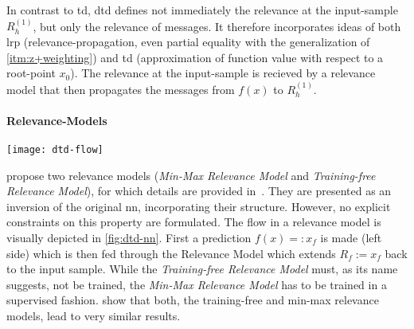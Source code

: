 \par
In contrast to \gls{td}, \gls{dtd} defines not immediately the relevance at the input-sample \(R_{h}^{(1)}\), but only the relevance of \glspl{message}. It therefore incorporates ideas of both \gls{lrp} (relevance-propagation, even partial equality with the generalization of \ref{itm:z+weighting}) and \gls{td} (approximation of function value with respect to a root-point \(x_0\)). The relevance at the input-sample is recieved by a relevance model that then propagates the \glspl{message} from \(f(x)\) to \(R_{h}^{(1)}\).
\paragraph{Relevance-Models}
\begin{figure*}[h]
    \center
    \texttt{[image: dtd-flow]}
    \caption[Deeper Neural Network; prediction and propagation via \gls{dtd}]{\textbf{Left:} A neural network at prediction time. \textbf{Right:} exemplary \gls{dtd} Relevance Model, adopted from \protect\cite{Montavon.2017}. Note, that in this work, usually \(R_h\) is used instead of \(R_p\).}\label{fig:dtd-nn}
\end{figure*}
 propose two relevance models (\textit{Min-Max Relevance Model} and \textit{Training-free Relevance Model}), for which details are provided in~\cite{Montavon.2017}. They are presented as an inversion of the original \gls{nn}, incorporating their structure. However, no explicit constraints on this property are formulated. The flow in a relevance model is visually depicted in \cref{fig:dtd-nn}. First a prediction \(f(x)=:x_f\) is made (left side) which is then fed through the Relevance Model which extends \(R_f:=x_f\) back to the input sample. While the \textit{Training-free Relevance Model} must, as its name suggests, not be trained, the \textit{Min-Max Relevance Model} has to be trained in a supervised fashion.  show that both, the training-free and min-max relevance models, lead to very similar results.